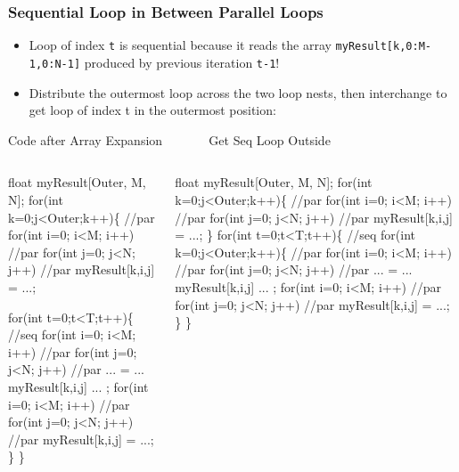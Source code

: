 \documentclass{beamer}
\newcommand{\emp}[1]{\textcolor{DikuRed}{ #1}}
\newcommand{\emphh}[1]{\textcolor{CosGreen}{ #1}}
\begin{document}
\begin{frame}[fragile]
	\tableofcontents[currentsection]
\end{frame}


\begin{frame}[fragile,t]
  \frametitle{Sequential Loop in Between Parallel Loops} %


\begin{itemize}
    \item \emp{Loop of index {\tt t} is sequential} because
            it reads the array {\tt myResult[k,0:M-1,0:N-1]}
            produced by previous iteration {\tt t-1}! 
    \item Distribute the outermost loop across the two loop nests,
            then interchange to get \emp{loop of index t} in the
            outermost position: 
\end{itemize}

\begin{block}{Code after Array Expansion {\tt~~~~~~} Get Seq Loop Outside}
\begin{columns}
\begin{colorcode}
float myResult[Outer, M, N];
\emphh{for(int k=0;j<Outer;k++)\{ //par}
  \emphh{for(int i=0; i<M; i++) //par}
    \emphh{for(int j=0; j<N; j++) //par}
      \emp{myResult[k,i,j] = ...;}

  \emp{for(int t=0;t<T;t++)\{ //seq}
    \emphh{for(int i=0; i<M; i++) //par}
      \emphh{for(int j=0; j<N; j++) //par}
        ... = ... \emp{myResult[k,i,j]} ... ;
    \emphh{for(int i=0; i<M; i++) //par}
      \emphh{for(int j=0; j<N; j++) //par}
        \emp{myResult[k,i,j]} = ...;
  \emp{\}} 
\emphh{\}}
\end{colorcode}
\begin{colorcode}
float myResult[Outer, M, N];
\emphh{for(int k=0;j<Outer;k++)\{ //par}
  \emphh{for(int i=0; i<M; i++) //par}
    \emphh{for(int j=0; j<N; j++) //par}
      \emp{myResult[k,i,j] = ...;}
\}
\emp{for(int t=0;t<T;t++)\{ //seq}
  \emphh{for(int k=0;j<Outer;k++)\{ //par}
    \emphh{for(int i=0; i<M; i++) //par}
      \emphh{for(int j=0; j<N; j++) //par}
        ... = ... \emp{myResult[k,i,j]} ... ;
    \emphh{for(int i=0; i<M; i++) //par}
      \emphh{for(int j=0; j<N; j++) //par}
        \emp{myResult[k,i,j]} = ...;
\emp{\}} \emphh{\}} 
\end{colorcode}
\end{columns}
\end{block} 

\end{frame}
\end{document}
